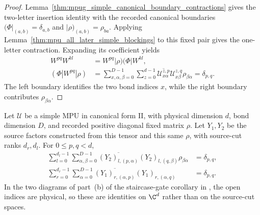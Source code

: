\begin{proof}\leanok
    Lemma~\ref{thm:mpug_simple_canonical_boundary_contractions}
    gives the two-letter insertion identity with the recorded canonical
    boundaries $(\Phi|_{(a,b)}=\delta_{a,b}$ and
    $|\rho)_{(a,b)}=\rho_{ba}$. Applying
    Lemma~\ref{thm:mpu_all_later_simple_blockings} to this fixed pair
    gives the one-letter contraction. Expanding its coefficient yields
    \begin{align}
        W^{pq}W^{kl} & =W^{pq}|\rho)(\Phi|W^{kl},                     \\
        (\Phi|W^{pq}|\rho)
                     & =\sum_{x,\alpha,\beta=0}^{D-1}\sum_{z=0}^{d-1}
        \overline{\mathcal U^{z,p}_{x\alpha}}
        \mathcal U^{z,q}_{x\beta}\rho_{\beta\alpha}
        =\delta_{p,q}.
    \end{align}
    The left boundary identifies the two bond indices $x$, while the
    right boundary contributes $\rho_{\beta\alpha}$.
\end{proof}

\begin{lemma}
    \label{thm:mpug_source_y_physical_contractions}
    \leanok
    Let $\mathcal U$ be a simple MPU in canonical form II, with physical
    dimension $d$, bond dimension $D$, and recorded positive diagonal
    fixed matrix $\rho$. Let $Y_1,Y_2$ be the source factors constructed
    from this tensor and this same $\rho$, with source-cut ranks $d_r,d_l$.
    For $0\leq p,q<d$,
    \begin{align}
        \sum_{l=0}^{d_l-1}\sum_{\alpha,\beta=0}^{D-1}
        \overline{(Y_2)_{l,(p,\alpha)}}(Y_2)_{l,(q,\beta)}
        \rho_{\beta\alpha}
         & =\delta_{p,q}, \\
        \sum_{r=0}^{d_r-1}\sum_{\alpha=0}^{D-1}
        \overline{(Y_1)_{r,(\alpha,p)}}(Y_1)_{r,(\alpha,q)}
         & =\delta_{p,q}.
    \end{align}
    In the two diagrams of part~(b) of the staircase-gate corollary in
    \cite[lines~869--917]{FrancoRubio2025MPUGauging}, the open indices are
    physical, so these are identities on $\C^d$ rather than on the
    source-cut spaces.
\end{lemma}

